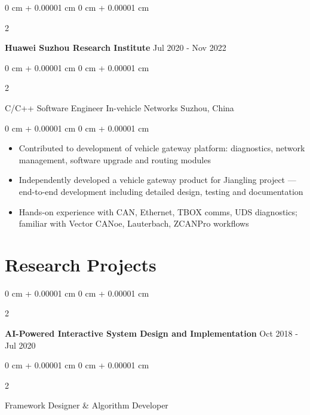 \documentclass[10pt, a4paper]{article}
\newenvironment{highlights}{
    \begin{itemize}[
        topsep=0.15 cm,
        parsep=0.08 cm,
        partopsep=0pt,
        itemsep=0.05 cm,
        leftmargin=0 cm + 10pt
    ]
}{
    \end{itemize}
} %
\newenvironment{onecolentry}{
    \begin{adjustwidth}{
        0 cm + 0.00001 cm
    }{
        0 cm + 0.00001 cm
    }
}{
    \end{adjustwidth}
} %
\newenvironment{twocolentry}[2][]{
    \onecolentry
    \def\secondColumn{#2}
    \setcolumnwidth{\fill, 4.5 cm}
    \begin{paracol}{2}
}{
    \switchcolumn \raggedleft \secondColumn
    \end{paracol}
    \endonecolentry
} %
\begin{document}
        \vspace{0.2 cm}

        \begin{twocolentry}{
            Jul 2020 - Nov 2022
        }
            \textbf{Huawei Suzhou Research Institute}\end{twocolentry}

        \begin{twocolentry}{
            Suzhou, China
        }
            C/C++ Software Engineer In-vehicle Networks\end{twocolentry}

        \vspace{0.10 cm}
        \begin{onecolentry}
            \begin{highlights}
                \item Contributed to development of vehicle gateway platform: diagnostics, network management, software upgrade and routing modules
                \item Independently developed a vehicle gateway product for Jiangling project — end-to-end development including detailed design, testing and documentation
                \item Hands-on experience with CAN, Ethernet, TBOX comms, UDS diagnostics; familiar with Vector CANoe, Lauterbach, ZCANPro workflows
            \end{highlights}
        \end{onecolentry}



    
    \section{Research Projects}

        \begin{twocolentry}{
            Oct 2018 - Jul 2020
        }
            \textbf{AI-Powered Interactive System Design and Implementation}\end{twocolentry}

        \begin{twocolentry}{
            
        }
            Framework Designer \& Algorithm Developer\end{twocolentry}
\end{document}
